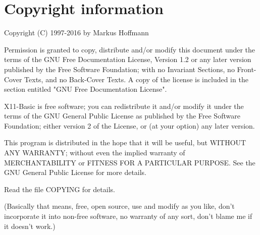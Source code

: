 \section*{Copyright information}

Copyright (C) 1997-2016 by Markus Hoffmann 

Permission is granted to copy, distribute and/or modify this document
under the terms of the GNU Free Documentation License, Version 1.2
or any later version published by the Free Software Foundation;
with no Invariant Sections, no Front-Cover Texts, and no Back-Cover Texts.
A copy of the license is included in the section entitled "GNU
Free Documentation License".

X11-Basic is free software; you can redistribute it and/or modify it under the
terms of the GNU General Public License as published by the Free Software
Foundation; either version 2 of the License, or (at your option) any later
version.

This program is distributed in the hope that it will be useful, but WITHOUT ANY
WARRANTY; without even the implied warranty of MERCHANTABILITY or FITNESS FOR
A PARTICULAR PURPOSE. See the GNU General Public License for more details.

Read the file COPYING for details.

(Basically that means, free, open source, use and modify as you like, don't
incorporate it into non-free software, no warranty of any sort, don't blame me
if it doesn't work.)
